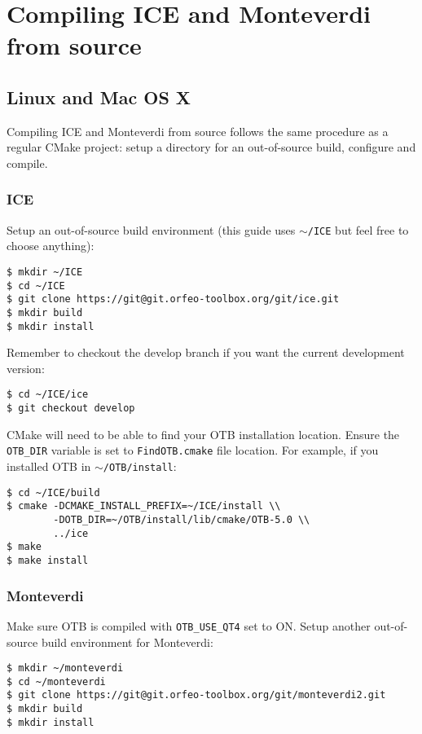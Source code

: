 \setcounter{secnumdepth}{3}

\chapter{Compiling ICE and Monteverdi from source}
\label{chapter:CompilingIceandMonteverdi}

\section{Linux and Mac OS X}

Compiling ICE and Monteverdi from source follows the same procedure as a regular CMake project: setup a directory for an
out-of-source build, configure and compile.

\subsection{ICE}

Setup an out-of-source build environment (this guide uses \texttt{$\sim$/ICE} but feel free to choose anything):
\begin{verbatim}
$ mkdir ~/ICE
$ cd ~/ICE
$ git clone https://git@git.orfeo-toolbox.org/git/ice.git
$ mkdir build
$ mkdir install
\end{verbatim}

Remember to checkout the develop branch if you want the current development version:
\begin{verbatim}
$ cd ~/ICE/ice
$ git checkout develop
\end{verbatim}

CMake will need to be able to find your OTB installation location.
Ensure the \texttt{OTB\_DIR} variable is set to \texttt{FindOTB.cmake} file location.
For example, if you installed OTB in \texttt{$\sim$/OTB/install}:
\begin{verbatim}
$ cd ~/ICE/build
$ cmake -DCMAKE_INSTALL_PREFIX=~/ICE/install \\
        -DOTB_DIR=~/OTB/install/lib/cmake/OTB-5.0 \\
        ../ice
$ make
$ make install
\end{verbatim}

\subsection{Monteverdi}

Make sure OTB is compiled with \texttt{OTB\_USE\_QT4} set to ON.
Setup another out-of-source build environment for Monteverdi:
\begin{verbatim}
$ mkdir ~/monteverdi
$ cd ~/monteverdi
$ git clone https://git@git.orfeo-toolbox.org/git/monteverdi2.git
$ mkdir build
$ mkdir install
\end{verbatim}

